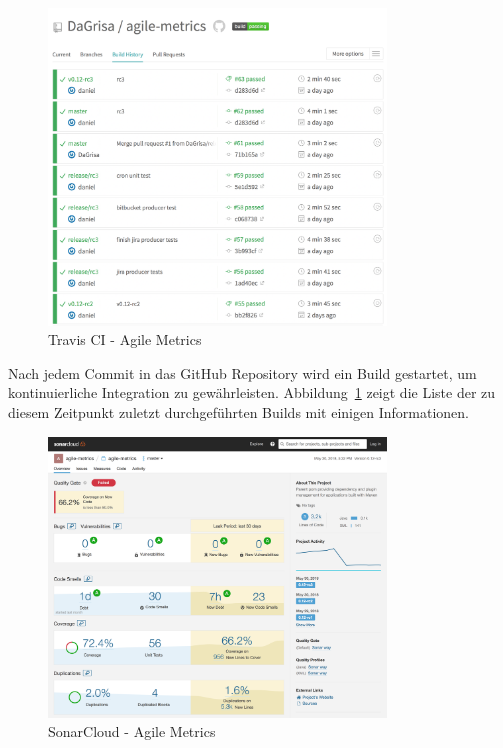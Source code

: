 \begin{savenotes}
    \begin{figure}[H] 
        \centering
            \includegraphics[width=0.8\textwidth]{img/travisci.png}
        \caption{Travis CI {-} Agile Metrics}\label{fig:travisci}
    \end{figure}
\end{savenotes}

Nach jedem Commit in das GitHub Repository wird ein Build gestartet, um kontinuierliche Integration zu gewährleisten.
Abbildung~\ref{fig:travisci} zeigt die Liste der zu diesem Zeitpunkt zuletzt durchgeführten Builds mit einigen Informationen.

\begin{savenotes}
    \begin{figure}[H] 
        \centering
            \includegraphics[width=0.8\textwidth]{img/sonarcloud.png}
        \caption{SonarCloud {-} Agile Metrics}\label{fig:sonarcloud}
    \end{figure}
\end{savenotes}

